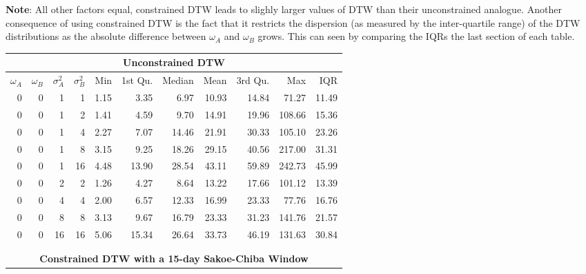 \documentclass[12pt]{article}
\begin{document}
\begin{table}[!ht]
\begin{tablenotes}
        \item{\footnotesize \textbf{Note}: All other factors equal, constrained DTW leads to slighly larger values of DTW than their unconstrained analogue. Another consequence of using constrained DTW is the fact that it restricts the dispersion (as measured by the inter-quartile range) of the DTW distributions as the absolute difference between $\omega_{A}$ and $\omega_{B}$ grows. This can seen by comparing the IQRs the last section of each table.}
    \end{tablenotes}
\end{table}


\begin{table}[!ht]
    \fontsize{10pt}{10pt}\selectfont
    \begin{center}
      \begin{tabular}{r r r r | r r r r r r r}
        \multicolumn{11}{c}{\textbf{Unconstrained DTW}} \\
        \midrule
        $\omega_{A}$ & $\omega_{B}$ & $\sigma^{2}_{A}$ & $\sigma^{2}_{B}$ & Min & 1st Qu. & Median & Mean & 3rd Qu. & Max & IQR \\
        \midrule
        0 & 0 & 1  & 1  & 1.15 &  3.35 &  6.97 & 10.93 & 14.84 &  71.27 & 11.49  \\
        \midrule
        0 & 0 & 1  & 2  & 1.41 &  4.59 &  9.70 & 14.91 & 19.96 & 108.66 & 15.36  \\
        0 & 0 & 1  & 4  & 2.27 &  7.07 & 14.46 & 21.91 & 30.33 & 105.10 & 23.26  \\
        0 & 0 & 1  & 8  & 3.15 &  9.25 & 18.26 & 29.15 & 40.56 & 217.00 & 31.31  \\
        0 & 0 & 1  & 16 & 4.48 & 13.90 & 28.54 & 43.11 & 59.89 & 242.73 & 45.99  \\
        \midrule
        0 & 0 & 2  & 2  & 1.26 &  4.27 &  8.64 & 13.22 & 17.66 & 101.12 & 13.39  \\
        0 & 0 & 4  & 4  & 2.00 &  6.57 & 12.33 & 16.99 & 23.33 &  77.76 & 16.76  \\
        0 & 0 & 8  & 8  & 3.13 &  9.67 & 16.79 & 23.33 & 31.23 & 141.76 & 21.57  \\
        0 & 0 & 16 & 16 & 5.06 & 15.34 & 26.64 & 33.73 & 46.19 & 131.63 & 30.84  \\
        \hline
        \\
        \\
        \multicolumn{11}{c}{\textbf{Constrained DTW with a 15-day Sakoe-Chiba Window}} \\
        \midrule

\end{tabular}
\end{center}
\end{table}
\end{document}
